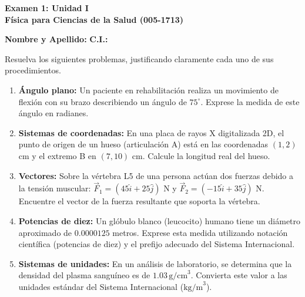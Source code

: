 \documentclass[12pt,letterpaper]{article}
\begin{document}
\begin{center}
    \textbf{\Large Examen 1: Unidad I}\\
    \vspace{0.2cm}
    \textbf{Física para Ciencias de la Salud (005-1713)}\\
\end{center}

\vspace{0.5cm}
\noindent \textbf{Nombre y Apellido:} \underline{\hspace{7cm}} \hfill \textbf{C.I.:} \underline{\hspace{4cm}}

\vspace{0.5cm}
\noindent Resuelva los siguientes problemas, justificando claramente cada uno de sus procedimientos.

\vspace{0.5cm}

\begin{enumerate}

    \item \textbf{Ángulo plano:} Un paciente en rehabilitación realiza un movimiento de flexión con su brazo describiendo un ángulo de $75^\circ$. Exprese la medida de este ángulo en radianes.
    \vspace{3.5cm}

    \item \textbf{Sistemas de coordenadas:} En una placa de rayos X digitalizada 2D, el punto de origen de un hueso (articulación A) está en las coordenadas $(1, 2)$ cm y el extremo B en $(7, 10)$ cm. Calcule la longitud real del hueso.
    \vspace{3.5cm}
    
    \item \textbf{Vectores:} Sobre la vértebra L5 de una persona actúan dos fuerzas debido a la tensión muscular: $\vec{F}_1 = (45\hat{i} + 25\hat{j})$ N y $\vec{F}_2 = (-15\hat{i} + 35\hat{j})$ N. Encuentre el vector de la fuerza resultante que soporta la vértebra.
    \vspace{3.5cm}
    
    \item \textbf{Potencias de diez:} Un glóbulo blanco (leucocito) humano tiene un diámetro aproximado de $0.0000125$ metros. Exprese esta medida utilizando notación científica (potencias de diez) y el prefijo adecuado del Sistema Internacional.
    \vspace{3.5cm}

    \item \textbf{Sistemas de unidades:} En un análisis de laboratorio, se determina que la densidad del plasma sanguíneo es de $1.03 \, \text{g/cm}^3$. Convierta este valor a las unidades estándar del Sistema Internacional ($\text{kg/m}^3$).
    \vspace{3.5cm}

\end{enumerate}
\end{document}
